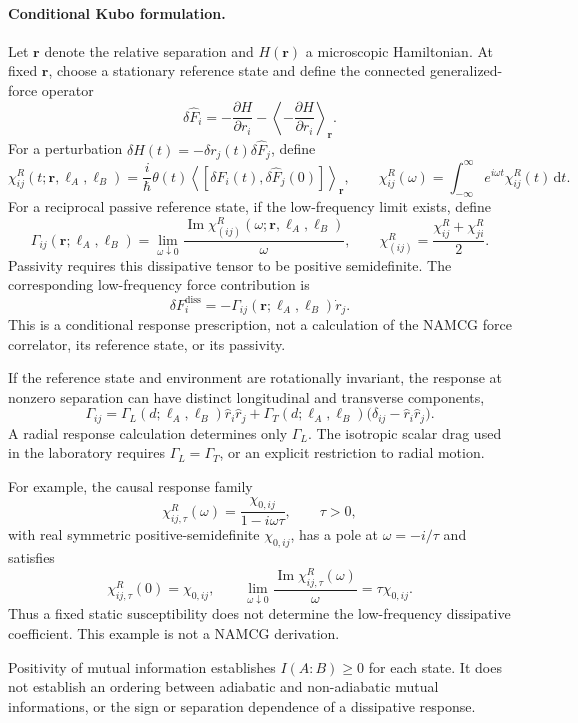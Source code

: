 \paragraph{Conditional Kubo formulation.}
Let \(\mathbf r\) denote the relative separation and
\(H(\mathbf r)\) a microscopic Hamiltonian. At fixed \(\mathbf r\),
choose a stationary reference state and define the connected
generalized-force operator
\[
\delta\hat F_i
=
-\frac{\partial H}{\partial r_i}
-\left\langle-\frac{\partial H}{\partial r_i}\right\rangle_{\mathbf r}.
\]
For a perturbation
\(\delta H(t)=-\delta r_j(t)\delta\hat F_j\), define
\[
\chi^R_{ij}(t;\mathbf r,\ell_A,\ell_B)
=
\frac{i}{\hbar}\theta(t)
\left\langle[\delta\hat F_i(t),\delta\hat F_j(0)]\right\rangle_{\mathbf r},
\qquad
\chi^R_{ij}(\omega)
=
\int_{-\infty}^{\infty} e^{i\omega t}
\chi^R_{ij}(t)\,\mathrm dt .
\]
For a reciprocal passive reference state, if the low-frequency
limit exists, define
\[
\Gamma_{ij}(\mathbf r;\ell_A,\ell_B)
=
\lim_{\omega\downarrow0}
\frac{\operatorname{Im}\chi^R_{(ij)}
(\omega;\mathbf r,\ell_A,\ell_B)}{\omega},
\qquad
\chi^R_{(ij)}=\frac{\chi^R_{ij}+\chi^R_{ji}}{2}.
\]
Passivity requires this dissipative tensor to be positive
semidefinite. The corresponding low-frequency force contribution is
\[
\delta F_i^{\mathrm{diss}}
=
-\Gamma_{ij}(\mathbf r;\ell_A,\ell_B)\dot r_j.
\]
This is a conditional response prescription, not a calculation of
the NAMCG force correlator, its reference state, or its passivity.

If the reference state and environment are rotationally invariant,
the response at nonzero separation can have distinct longitudinal
and transverse components,
\[
\Gamma_{ij}
=
\Gamma_L(d;\ell_A,\ell_B)\hat r_i\hat r_j
+\Gamma_T(d;\ell_A,\ell_B)
 \bigl(\delta_{ij}-\hat r_i\hat r_j\bigr).
\]
A radial response calculation determines only \(\Gamma_L\).
The isotropic scalar drag used in the laboratory requires
\(\Gamma_L=\Gamma_T\), or an explicit restriction to radial motion.

For example, the causal response family
\[
\chi^R_{ij,\tau}(\omega)
=
\frac{\chi_{0,ij}}{1-i\omega\tau},
\qquad \tau>0,
\]
with real symmetric positive-semidefinite \(\chi_{0,ij}\), has a
pole at \(\omega=-i/\tau\) and satisfies
\[
\chi^R_{ij,\tau}(0)=\chi_{0,ij},
\qquad
\lim_{\omega\downarrow0}
\frac{\operatorname{Im}\chi^R_{ij,\tau}(\omega)}{\omega}
=\tau\chi_{0,ij}.
\]
Thus a fixed static susceptibility does not determine the
low-frequency dissipative coefficient. This example is not a
NAMCG derivation.

Positivity of mutual information establishes \(I(A:B)\geq0\) for
each state. It does not establish an ordering between adiabatic
and non-adiabatic mutual informations, or the sign or separation
dependence of a dissipative response.

